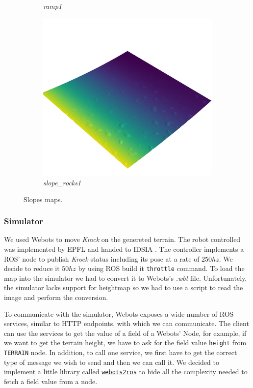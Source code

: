 \documentclass[../document.tex]{subfiles}
\begin{document}
\begin{figure}[H]
\begin{subfigure}[b]{0.32\linewidth}
            \caption{\emph{ramp1}}
            \end{subfigure}    
          \begin{subfigure}[b]{0.32\textwidth}
            \includegraphics[width=\textwidth]{../img/hm3d/slope_rocks1.png}
            \caption{\emph{slope\_rocks1}}
        \end{subfigure}    
    \label{fig: heightmaps}
    \caption{Slopes maps.}
\end{figure}

\subsubsection{Simulator}
We used Webots to move \emph{Krock} on the genereted terrain. The robot controlled was implemented by EPFL  and handed to IDSIA . The controller implements a ROS' node to publish \emph{Krock} status including its pose at a rate of $250hz$. We decide to reduce it $50hz$ by using ROS build it \texttt{throttle} command. 
To load the map into the simulator we had to convert it to Webots's \emph{.wbt} file. Unfortunately, the simulator lacks support for heightmap so we had to use a script to read the image and perform the conversion.

To communicate with the simulator, Webots exposes a wide number of ROS services, similar to HTTP endpoints, with which we can communicate. The client can use the services to get the value of a field of a Webots' Node, for example, if we want to get the terrain height, we have to ask for the field value \texttt{height} from \texttt{TERRAIN} node. In addition, to call one service, we first have to get the correct type of message we wish to send and then we can call it. We decided to implement a little library called \href{https://github.com/FrancescoSaverioZuppichini/Master-Thesis/tree/master/core/utilities/webots2ros}{\texttt{webots2ros}} to hide all the complexity needed to fetch a field value from a node.
\end{document}
